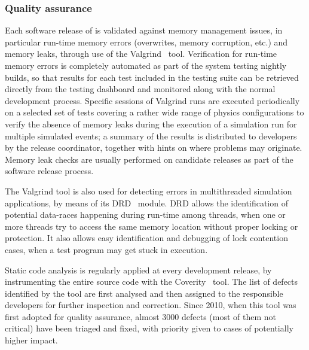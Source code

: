
\subsubsection{Quality assurance}
Each software release of \Gfour{} is validated against memory management issues,
in particular run-time memory errors (overwrites, memory corruption, etc.) and 
memory leaks, through use of the Valgrind~\cite{QA:valgrind} tool.  Verification
for run-time memory errors is completely automated as part of the system 
testing nightly builds, so that results for each test included in the testing 
suite can be retrieved directly from the testing dashboard and monitored along 
with the normal development process.  Specific sessions of Valgrind runs are 
executed periodically on a selected set of tests covering a rather wide range of
physics configurations to verify the absence of memory leaks during the 
execution of a simulation run for multiple simulated events; a summary of the 
results is distributed to developers by the release coordinator, together with 
hints on where problems may originate.  Memory leak checks are usually performed
on candidate releases as part of the software release process.

The Valgrind tool is also used for detecting errors in multithreaded simulation
applications, by means of its DRD~\cite{QA:DRD} module.  DRD allows the
identification of potential data-races happening during run-time among threads,
when one or more threads try to access the same memory location without proper
locking or protection.  It also allows easy identification and debugging of
lock contention cases, when a test program may get stuck in execution.

Static code analysis is regularly applied at every development release, by 
instrumenting the entire source code with the Coverity~\cite{QA:coverity}
tool.  The list of defects identified by the tool are first analysed and then
assigned to the responsible developers for further inspection and correction.
Since 2010, when this tool was first adopted for quality assurance, almost 3000
defects (most of them not critical) have been triaged and fixed, with priority
given to cases of potentially higher impact.

